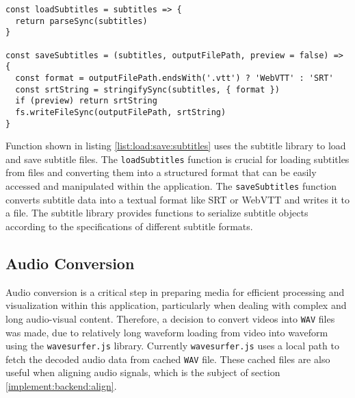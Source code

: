 \begin{clisting}
\label{list:load:save:subtitles}
\begin{verbatim}
const loadSubtitles = subtitles => {
  return parseSync(subtitles)
}

const saveSubtitles = (subtitles, outputFilePath, preview = false) => {
  const format = outputFilePath.endsWith('.vtt') ? 'WebVTT' : 'SRT'
  const srtString = stringifySync(subtitles, { format })
  if (preview) return srtString
  fs.writeFileSync(outputFilePath, srtString)
}
\end{verbatim}
\end{clisting}
\noindent Function shown in listing \ref{list:load:save:subtitles} uses the subtitle library to load and save subtitle files. The \texttt{loadSubtitles} function is crucial for loading subtitles from files and converting them into a structured format that can be easily accessed and manipulated within the application. The \texttt{saveSubtitles} function converts subtitle data into a textual format like SRT or WebVTT and writes it to a file. The subtitle library provides functions to serialize subtitle objects according to the specifications of different subtitle formats.

\subsection{Audio Conversion}
\label{implement:backend:convert}

Audio conversion is a critical step in preparing media for efficient processing and visualization within this application, particularly when dealing with complex and long audio-visual content. Therefore, a decision to convert videos into \texttt{WAV} files was made, due to relatively long waveform loading from video into waveform using the \texttt{wavesurfer.js} library. Currently \texttt{wavesurfer.js} uses a local path to fetch the decoded audio data from cached \texttt{WAV} file. These cached files are also useful when aligning audio signals, which is the subject of section \ref{implement:backend:align}.


